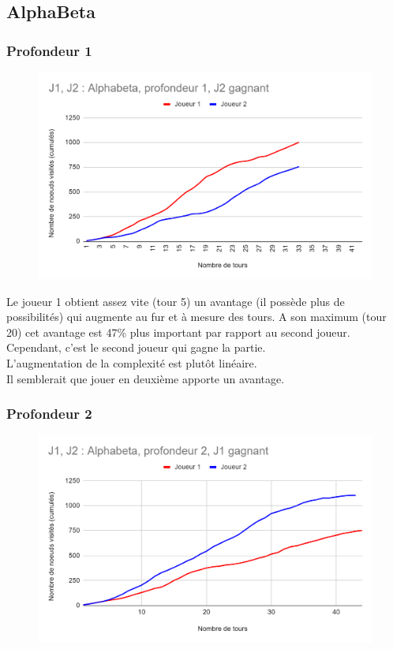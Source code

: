 \documentclass[12pt]{article}
\begin{document}
\subsection{AlphaBeta}

\subsubsection{Profondeur 1}

\begin{figure}[!h]
   \includegraphics[width=\textwidth]{prof1alphabeta.png}
\end{figure}

Le joueur 1 obtient assez vite (tour 5) un avantage (il possède plus de possibilités) qui augmente au fur et à mesure des tours. A son maximum (tour 20) cet avantage est 47\% plus important par rapport au second joueur.\\
Cependant, c'est le second joueur qui gagne la partie.\\

L’augmentation de la complexité est plutôt linéaire.\\
Il semblerait que jouer en deuxième apporte un avantage.
\newpage
\subsubsection{Profondeur 2}

\begin{figure}[!h]
   \includegraphics[width=\textwidth]{prof2alphabeta.png}
\end{figure}
\end{document}
